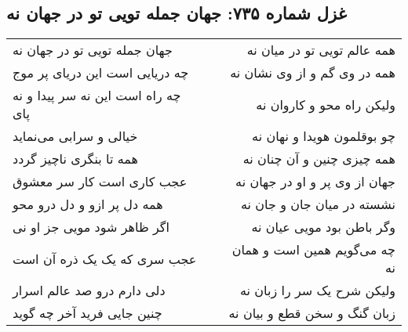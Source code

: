\begin{center}
\section*{غزل شماره ۷۳۵: جهان جمله تویی تو در جهان نه}
\label{sec:735}
\begin{longtable}{l p{0.5cm} r}
جهان جمله تویی تو در جهان نه
&&
همه عالم تویی تو در میان نه
\\
چه دریایی است این دریای پر موج
&&
همه در وی گم و از وی نشان نه
\\
چه راه است این نه سر پیدا و نه پای
&&
ولیکن راه محو و کاروان نه
\\
خیالی و سرابی می‌نماید
&&
چو بوقلمون هویدا و نهان نه
\\
همه تا بنگری ناچیز گردد
&&
همه چیزی چنین و آن چنان نه
\\
عجب کاری است کار سر معشوق
&&
جهان از وی پر و او در جهان نه
\\
همه دل پر ازو و دل درو محو
&&
نشسته در میان جان و جان نه
\\
اگر ظاهر شود مویی جز او نی
&&
وگر باطن بود مویی عیان نه
\\
عجب سری که یک یک ذره آن است
&&
چه می‌گویم همین است و همان نه
\\
دلی دارم درو صد عالم اسرار
&&
ولیکن شرح یک سر را زبان نه
\\
چنین جایی فرید آخر چه گوید
&&
زبان گنگ و سخن قطع و بیان نه
\\
\end{longtable}
\end{center}
